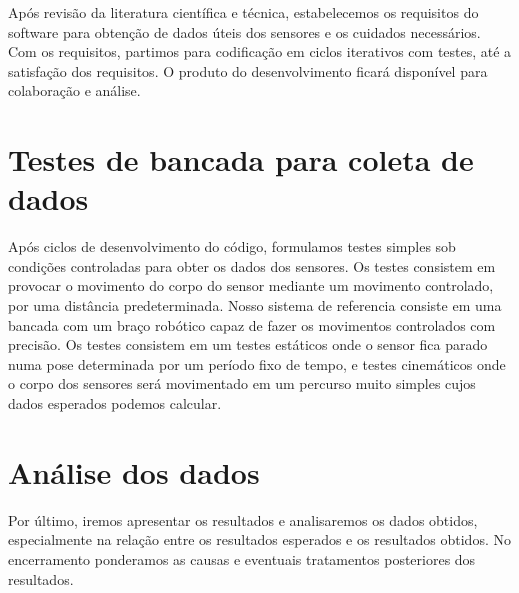Após revisão da literatura científica e técnica, estabelecemos os requisitos do software para obtenção de dados úteis dos sensores e os cuidados necessários. Com os requisitos, partimos para codificação em ciclos iterativos com testes, até a satisfação dos requisitos. O produto do desenvolvimento ficará disponível para colaboração e análise.

\section{Testes de bancada para coleta de dados}

Após ciclos de desenvolvimento do código, formulamos testes simples sob condições controladas para obter os dados dos sensores. Os testes consistem em provocar o movimento do corpo do sensor mediante um movimento controlado, por uma distância predeterminada. Nosso sistema de referencia consiste em uma bancada com um braço robótico capaz de fazer os movimentos controlados com precisão. Os testes consistem em um testes estáticos onde o sensor fica parado numa pose determinada por um período fixo de tempo, e testes cinemáticos onde o corpo dos sensores será movimentado em um percurso muito simples cujos dados esperados podemos calcular.

\section{Análise dos dados}

Por último, iremos apresentar os resultados e analisaremos os dados obtidos, especialmente na relação entre os resultados esperados e os resultados obtidos. No encerramento ponderamos as causas e eventuais tratamentos posteriores dos resultados.
